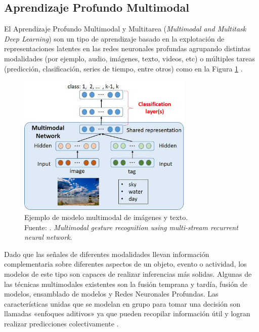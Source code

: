 \subsection{Aprendizaje Profundo Multimodal}
El Aprendizaje Profundo Multimodal y Multitarea (\textit{Multimodal and Multitask Deep Learning}) son un tipo de aprendizaje basado en la explotación de representaciones latentes en las redes neuronales profundas agrupando distintas modalidades (por ejemplo, audio, imágenes, texto, videos, etc) o múltiples tareas (predicción, clasificación, series de tiempo, entre otros) como en la Figura \ref{2:fig6} \parencite{bk_deng2018deeplearningnlp}.

\begin{figure}[!ht]
	\begin{center}
		\includegraphics[width=0.75\textwidth]{2/figures/multimodal_network.jpg}
		\caption[Ejemplo de modelo multimodal de imágenes y texto]{Ejemplo de modelo multimodal de imágenes y texto.\\
		Fuente: \cite{tec_nishida2015multimodal}. \textit{Multimodal gesture recognition using multi-stream recurrent neural network}.}
		\label{2:fig6}
	\end{center}
\end{figure}

Dado que las señales de diferentes modalidades llevan información complementaria sobre diferentes aspectos de un objeto, evento o actividad, los modelos de este tipo son capaces de realizar inferencias más solidas. Algunas de las técnicas multimodales existentes son la fusión temprana y tardía, fusión de modelos, ensamblado de modelos y Redes Neuronales Profundas. Las características unidas que se modelan en grupo para tomar una decisión son llamadas «enfoques aditivos» ya que pueden recopilar información útil y logran realizar predicciones colectivamente \parencite{tec_liu2018multideeplearning}.

